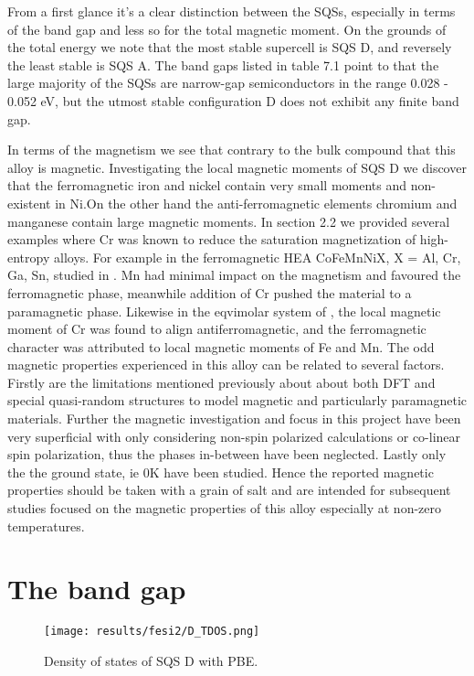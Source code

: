 From a first glance it's a clear distinction between the SQSs, especially in terms of the band gap and less so for the total magnetic moment. On the grounds of the total energy we note that the most stable supercell is SQS D, and reversely the least stable is SQS A. The band gaps listed in table 7.1 point to that the large majority of the SQSs are narrow-gap semiconductors in the range 0.028 - 0.052 eV, but the utmost stable configuration D does not exhibit any finite band gap.

In terms of the magnetism we see that contrary to the bulk  compound that this alloy is magnetic. Investigating the local magnetic moments of SQS D we discover that the ferromagnetic iron and nickel contain very small moments and non-existent in Ni.On the other hand the anti-ferromagnetic elements chromium and manganese contain large magnetic moments. In section 2.2 we provided several examples where Cr was known to reduce the saturation magnetization of high-entropy alloys. For example in the ferromagnetic HEA CoFeMnNiX, X = Al, Cr, Ga, Sn, studied in \cite{ZUO201710}. Mn had minimal impact on the magnetism and favoured the ferromagnetic phase, meanwhile addition of Cr pushed the material to a paramagnetic phase. Likewise in the eqvimolar system of  \cite{PhysRevB.96.014437}, the local magnetic moment of Cr was found to align antiferromagnetic, and the ferromagnetic character was attributed to local magnetic moments of Fe and Mn. The odd magnetic properties experienced in this alloy can be related to several factors. Firstly are the limitations mentioned previously about about both DFT and special quasi-random structures to model magnetic and particularly paramagnetic materials. Further the magnetic investigation and focus in this project have been very superficial with only considering non-spin polarized calculations or co-linear spin polarization, thus the phases in-between have been neglected. Lastly only the the ground state, ie 0K have been studied. Hence the reported magnetic properties should be taken with a grain of salt and are intended for subsequent studies focused on the magnetic properties of this alloy especially at non-zero temperatures. 

\section{The band gap}

\begin{figure}[H]
	\centering
	\texttt{[image: results/fesi2/D\_TDOS.png]}
	\caption{Density of states of SQS D  with PBE.}
\end{figure}

